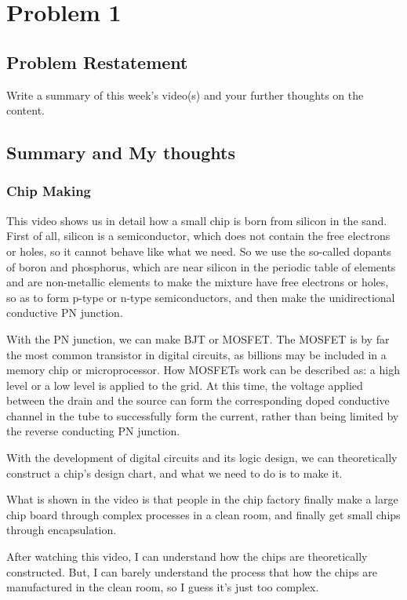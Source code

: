 \documentclass{article}
\begin{document}
\section{Problem 1}
\subsection{Problem Restatement}

Write a summary of this week’s video(s) and your further thoughts on the content.

\subsection{Summary and My thoughts}
\subsubsection{Chip Making}

This video shows us in detail how a small chip is born from silicon in the sand. First of all, silicon is a semiconductor, which does not contain the free electrons or holes, so it cannot behave like what we need. So we use the so-called dopants of boron and phosphorus, which are near silicon in the periodic table of elements and are non-metallic elements to make the mixture have free electrons or holes, so as to form p-type or n-type semiconductors, and then make the unidirectional conductive PN junction.

With the PN junction, we can make BJT or MOSFET. The MOSFET is by far the most common transistor in digital circuits, as billions may be included in a memory chip or microprocessor.\cite{enwiki:1109379174} How MOSFETs work can be described as: a high level or a low level is applied to the grid. At this time, the voltage applied between the drain and the source can form the corresponding doped conductive channel in the tube to successfully form the current, rather than being limited by the reverse conducting PN junction.

With the development of digital circuits and its logic design, we can theoretically construct a chip's design chart, and what we need to do is to make it.

What is shown in the video is that people in the chip factory finally make a large chip board through complex processes in a clean room, and finally get small chips through encapsulation.

After watching this video, I can understand how the chips are theoretically constructed. But, I can barely understand the process that how the chips are manufactured in the clean room, so I guess it's just too complex. 
\end{document}
